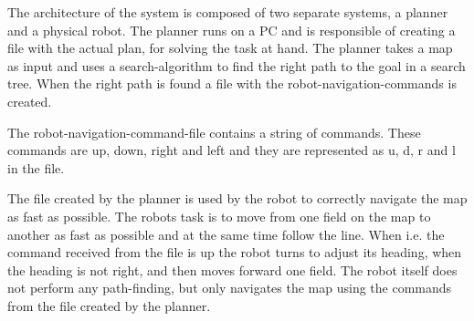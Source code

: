 The architecture of the system is composed of two separate systems, a planner and a physical robot.
The planner runs on a PC and is responsible of creating a file with the actual plan, for solving the task at hand. The planner takes a map as input and uses a search-algorithm to find the right path to the goal in a search tree. When the right path is found a file with the robot-navigation-commands is created.

The robot-navigation-command-file contains a string of commands. These commands are up, down, right and left and they are represented as u, d, r and l in the file.

The file created by the planner is used by the robot to correctly navigate the map as fast as possible. The robots task is to move from one field on the map to another as fast as possible and at the same time follow the line. When i.e. the command received from the file is up the robot turns to adjust its heading, when the heading is not right, and then moves forward one field. The robot itself does not perform any path-finding, but only navigates the map using the commands from the file created by the planner. 

